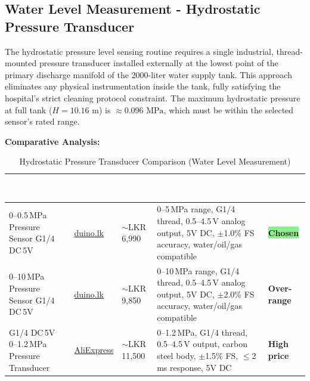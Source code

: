 \documentclass[12pt,a4paper]{article}
\newcommand{\badgegreen}[1]{%
  \colorbox{lightgreen}{\textcolor{badgegreen}{\footnotesize\textbf{#1}}}%
}
\newcommand{\badgeamber}[1]{%
  \colorbox{lightamber}{\textcolor{badgeamber}{\footnotesize\textbf{#1}}}%
}
\begin{document}
\subsection{Water Level Measurement - Hydrostatic Pressure Transducer}

The hydrostatic pressure level sensing routine requires a single industrial, thread-mounted pressure transducer installed externally at the lowest point of the primary discharge manifold of the 2000-liter water supply tank. This approach eliminates any physical instrumentation inside the tank, fully satisfying the hospital's strict cleaning protocol constraint. The maximum hydrostatic pressure at full tank ($H = 10.16\text{ m}$) is $\approx 0.096\text{ MPa}$, which must be within the selected sensor's rated range.

\vspace{0.3cm}
\noindent\textbf{Comparative Analysis:}

\begin{table}[H]
\centering
\setlength{\tabcolsep}{5pt}
\renewcommand{\arraystretch}{1.4}
\begin{tabular}{|p{3.2cm}|p{3.5cm}|p{2.2cm}|p{3.5cm}|p{2cm}|}
\hline
\rowcolor{headerblue}
\textcolor{white}{\textbf{Product}} &
\textcolor{white}{\textbf{Supplier}} &
\textcolor{white}{\textbf{Est. Cost}} &
\textcolor{white}{\textbf{Key Specifications}} &
\textcolor{white}{\textbf{Verdict}} \\
\hline
\rowcolor{chosen}
0--0.5\,MPa Pressure Sensor G1/4 DC\,5V &
\href{https://www.duino.lk/product/0-5mpa-pressure-sensor/}{duino.lk} &
$\sim$LKR 6,990 &
0--5\,MPa range, G1/4 thread, 0.5--4.5\,V analog output, 5V DC, $\pm$1.0\% FS accuracy, water/oil/gas compatible &
\badgegreen{Chosen} \\
\hline
0--10\,MPa Pressure Sensor G1/4 DC\,5V &
\href{https://www.duino.lk/product/0-10mpa-pressure-sensor-dc5v/}{duino.lk} &
$\sim$LKR 9,850 &
0--10\,MPa range, G1/4 thread, 0.5--4.5\,V analog output, 5V DC, $\pm$2.0\% FS accuracy, water/oil/gas compatible &
\badgeamber{Over-range} \\
\hline
G1/4 DC\,5V 0--1.2\,MPa Pressure Transducer &
\href{https://www.aliexpress.com/item/1005007233513998.html}{AliExpress} &
$\sim$LKR 11,500 &
0--1.2\,MPa, G1/4 thread, 0.5--4.5\,V output, carbon steel body, $\pm$1.5\% FS, $\leq$2\,ms response, 5V DC &
\badgeamber{High price} \\
\hline
\end{tabular}
\caption{Hydrostatic Pressure Transducer Comparison (Water Level Measurement)}
\end{table}
\end{document}
